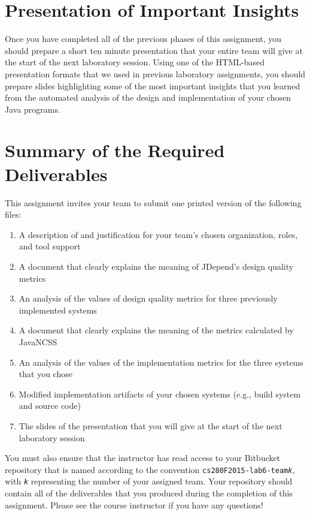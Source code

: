 \section*{Presentation of Important Insights}

Once you have completed all of the previous phases of this assignment, you should prepare a short ten minute
presentation that your entire team will give at the start of the next laboratory session. Using one of the HTML-based
presentation formats that we used in previous laboratory assignments, you should prepare slides highlighting some of the
most important insights that you learned from the automated analysis of the design and implementation of your chosen
Java programs.

\section*{Summary of the Required Deliverables}

This assignment invites your team to submit one printed version of the following files:
\vspace*{-.1in}
\begin{enumerate}
	\itemsep0em
	\item A description of and justification for your team's chosen organization, roles, and tool support
	\item A document that clearly explains the meaning of JDepend's design quality metrics
	\item An analysis of the values of design quality metrics for three previously implemented systems
	\item A document that clearly explains the meaning of the metrics calculated by JavaNCSS
	\item An analysis of the values of the implementation metrics for the three systems that you chose
	\item Modified implementation artifacts of your chosen systems (e.g., build system and source code)
	\item The slides of the presentation that you will give at the start of the next laboratory session
\end{enumerate}
\vspace*{-.1in}

You must also ensure that the instructor has read access to your Bitbucket repository that is named according to the
convention {\tt cs280F2015-lab6-team{\em k}}, with {\tt {\em k}} representing the number of your assigned team.  Your
repository should contain all of the deliverables that you produced during the completion of this assignment.  Please
see the course instructor if you have any questions!


